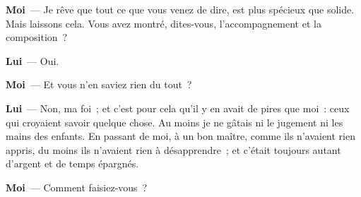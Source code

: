 \documentclass[french,twoside]{book} %
\newcommand{\labelchar}[1]{\textbf{\color{rubric} #1}}
\begin{document}
\labelchar{Moi} — Je rêve que tout ce que vous venez de dire, est plus spécieux que solide. Mais laissons cela. Vous avez montré, dites-vous, l’accompagnement et la composition ?\par
\labelchar{Lui} — Oui.\par
\labelchar{Moi} — Et vous n’en saviez rien du tout ?\par
\labelchar{Lui} — Non, ma foi ; et c’est pour cela qu’il y en avait de pires que moi : ceux qui croyaient savoir quelque chose. Au moins je ne gâtais ni le jugement ni les mains des enfants. En passant de moi, à un bon maître, comme ils n’avaient rien appris, du moins ils n’avaient rien à désapprendre ; et c’était toujours autant d’argent et de temps épargnés.\par
\labelchar{Moi} — Comment faisiez-vous ?\par
\end{document}
